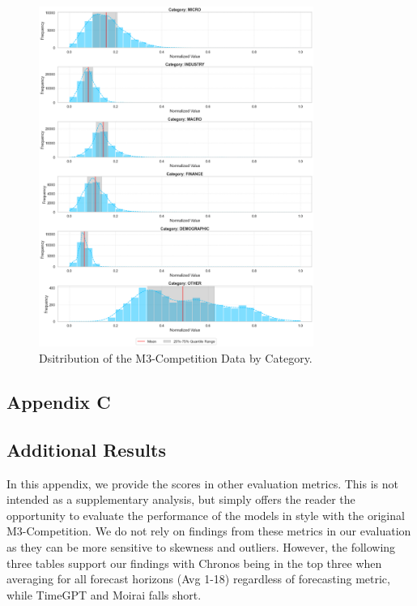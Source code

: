 \documentclass[12pt,a4paper]{article}
\begin{document}
\begin{figure}[htbp]
  \centering
  \includegraphics[width=0.8\textwidth]{real_distributions_data_descr.png}
  \caption{Dsitribution of the M3-Competition Data by Category.}
  \label{m3_distribution}
\end{figure}

\newpage

\begin{center}
  \item  \section*{Appendix C} \label{appendix_c}
\end{center}


\subsection*{Additional Results}


In this appendix, we provide the scores in other evaluation metrics. This is not intended as a supplementary analysis, but simply offers the reader the opportunity to evaluate the performance of the models in style with the original M3-Competition. We do not rely on findings from these metrics in our evaluation as they can be more sensitive to skewness and outliers. However, the following three tables support our findings with Chronos being in the top three when averaging for all forecast horizons (Avg 1-18) regardless of forecasting metric, while TimeGPT and Moirai falls short.
\end{document}
